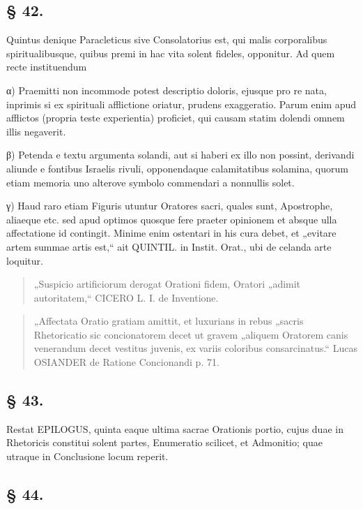 \subsection*{§ 42.}

Quintus denique Paracleticus sive Consolatorius est, qui malis corporalibus spiritualibusque, quibus premi in hac vita solent fideles, opponitur. Ad quem recte instituendum

α) Praemitti non incommode potest descriptio doloris, ejusque pro re nata, inprimis si ex spirituali afflictione oriatur, prudens exaggeratio. Parum enim apud afflictos (propria teste experientia) proficiet, qui causam statim dolendi omnem illis negaverit.

β) Petenda e textu argumenta solandi, aut si haberi ex illo non possint, derivandi aliunde e fontibus Israelis rivuli, opponendaque calamitatibus solamina, quorum etiam memoria uno alterove symbolo commendari a nonnullis solet.

γ) Haud raro etiam Figuris utuntur Oratores sacri, quales sunt, Apostrophe, aliaeque etc. sed apud optimos quosque fere praeter opinionem et absque ulla affectatione id contingit. Minime enim ostentari in his cura debet, et „evitare artem summae artis est,“ ait QUINTIL. in Instit. Orat., ubi de celanda arte loquitur.

\begin{quote}
„Suspicio artificiorum derogat Orationi fidem, Oratori „adimit autoritatem,“ CICERO L. I. de Inventione.
\end{quote}

\begin{quote}
„Affectata Oratio gratiam amittit, et luxurians in rebus „sacris Rhetoricatio sic concionatorem decet ut gravem „aliquem Oratorem canis venerandum decet vestitus juvenis, ex variis coloribus consarcinatus.“ Lucas OSIANDER de Ratione Concionandi p. 71.
\end{quote}

\subsection*{§ 43.}

Restat EPILOGUS, quinta eaque ultima sacrae Orationis portio, cujus duae in Rhetoricis constitui solent partes, Enumeratio scilicet, et Admonitio; quae utraque in Conclusione locum reperit.

\subsection*{§ 44.}

